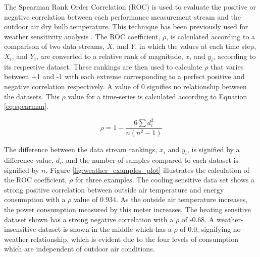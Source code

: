 The Spearman Rank Order Correlation (ROC) is used to evaluate the positive or negative correlation between each performance measurement stream and the outdoor air dry bulb temperature. This technique has been previously used for weather sensitivity analysis \citep{coughlin_statistical_2009}. The ROC coefficient, $\rho$, is calculated according to a comparison of two data streams, $X$, and $Y$, in which the values at each time step, $X_i$, and $Y_i$, are converted to a relative rank of magnitude, $x_i$ and $y_i$, according to its respective dataset. These rankings are then used to calculate $\rho$ that varies between +1 and -1 with each extreme corresponding to a perfect positive and negative correlation respectively. A value of 0 signifies no relationship between the datasets. This $\rho$ value for a time-series is calculated according to Equation \ref{eq:spearman}.

\begin{equation}
\rho = 1 - \frac{6\sum d_i^2}{n(n^2-1)}
\label{eq:spearman}
\end{equation}

The difference between the data stream rankings, $x_i$ and $y_i$, is signified by a difference value, $d_i$, and the number of samples compared to each dataset is signified by $n$. Figure \ref{fig:weather_examples_plot} illustrates the calculation of the ROC coefficient, $\rho$ for three examples. The cooling sensitive data set shows a strong positive correlation between outside air temperature and energy consumption with a $\rho$ value of 0.934. As the outside air temperature increases, the power consumption measured by this meter increases. The heating sensitive dataset shown has a strong negative correlation with a $\rho$ of -0.68. A weather-insensitive dataset is shown in the middle which has a $\rho$ of 0.0, signifying no weather relationship, which is evident due to the four levels of consumption which are independent of outdoor air conditions.

